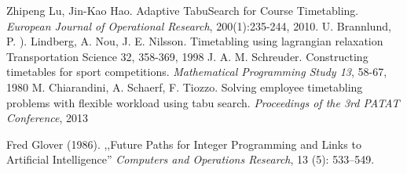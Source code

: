 \documentclass[11pt]{report}
\begin{document}
\begin{thebibliography}{2}
 Zhipeng Lu, Jin-Kao Hao. Adaptive TabuSearch for Course Timetabling.  \emph{European Journal of Operational Research}, 200(1):235-244, 2010.
 U. Brannlund, P. ). Lindberg, A. Nou, J. E. Nilsson. Timetabling using lagrangian relaxation Transportation Science 32, 358-369, 1998
 J. A. M. Schreuder. Constructing timetables for sport competitions. \emph{Mathematical Programming Study 13}, 58-67, 1980
 M. Chiarandini, A. Schaerf, F. Tiozzo. Solving employee timetabling problems with flexible workload using tabu search. \emph{Proceedings of the 3rd PATAT Conference}, 2013

 Fred Glover (1986). ,,Future Paths for Integer Programming and Links to Artificial Intelligence'' \emph{Computers and Operations Research}, 13 (5): 533–549.

\end{thebibliography}
\end{document}
